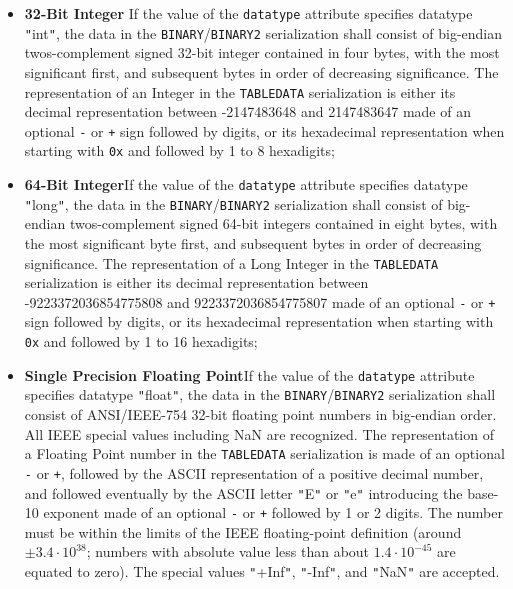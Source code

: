 \documentclass[11pt,a4paper]{ivoa}
\let\fg=\color
\def\attr#1{{\tt{\fg{DarkRed}#1}}}
\def\elem#1{{\tt{\fg{DarkRed}#1}}}
\def\literalvalue#1{{\tt"}{{\fg{DarkPurple}#1}}{\tt"}}
\begin{document}
{\begin{itemize}
\item {\bf 32-Bit Integer }\quad If the value of the {\attr{datatype}}
attribute specifies datatype {\literalvalue{int}},
the data in the \elem{BINARY}/\elem{BINARY2} serialization shall consist of
big-endian twos-complement signed 32-bit
integer contained in four bytes, with the most significant first,
and subsequent bytes in order of decreasing significance.
  The representation of an Integer in the \elem{TABLEDATA} serialization
  is either its decimal representation between -2147483648 and 2147483647
  made of an optional {\tt-} or {\tt+} sign followed by digits,
  or its hexadecimal representation when starting with {\tt0x}
  and followed by 1 to 8 hexadigits;

\item {\bf 64-Bit Integer}\quad If the value of the {\attr{datatype}}
attribute specifies datatype {\literalvalue{long}},
the data in the \elem{BINARY}/\elem{BINARY2} serialization shall consist of
big-endian twos-complement signed 64-bit integers
contained in eight bytes, with the most significant byte first,
and subsequent bytes in order of decreasing significance.
The representation of a Long Integer in the \elem{TABLEDATA} serialization
  is either its decimal representation between -9223372036854775808
  and 9223372036854775807
  made of an optional {\tt-} or {\tt+} sign followed by digits,
  or its hexadecimal representation when starting with {\tt0x}
  and followed by 1 to 16 hexadigits;


\item {\bf Single Precision Floating Point}\quad If
the value of the {\attr{datatype}} attribute specifies datatype {\literalvalue{float}},
the data in the \elem{BINARY}/\elem{BINARY2} serialization shall consist of
ANSI/IEEE-754 32-bit floating point numbers in big-endian order.
All IEEE special values including NaN are recognized.
The representation of a Floating Point number in the
\elem{TABLEDATA} serialization is made of an optional {\tt-} or {\tt+},
followed by the ASCII representation of a positive decimal number,
and followed eventually by the ASCII letter \literalvalue{E} or  \literalvalue{e}
introducing the base-10 exponent made of an optional {\tt-} or {\tt+}
followed by 1 or 2 digits. The number must be within the limits of the
IEEE floating-point definition (around $\pm3.4\cdot10^{38}$; numbers with
absolute value less than about $1.4\cdot10^{-45}$ are equated to zero).
The special
values \literalvalue{+Inf}, \literalvalue{-Inf}, and \literalvalue{NaN} are accepted.



\end{itemize}}
\end{document}
